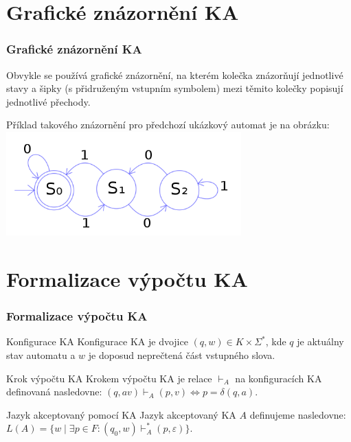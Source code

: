 \documentclass{beamer}
\begin{document}
	\section{Grafické znázornění KA}
	\begin{frame}
		\frametitle{Grafické znázornění KA}
		Obvykle se používá grafické znázornění, na kterém kolečka znázorňují jednotlivé stavy a šipky (s přidruženým vstupním symbolem) mezi těmito kolečky popisují jednotlivé přechody.
		
		Příklad takového znázornění pro předchozí ukázkový automat je na obrázku:\\
		\includegraphics[height=4cm]{example.png}
	\end{frame}

	\section{Formalizace výpočtu KA}
	\begin{frame}
		\frametitle{Formalizace výpočtu KA}
		\begin{block}{Konfigurace KA}
			Konfigurace KA je dvojice $(q , w) \in K \times \Sigma^*$, kde $q$ je aktuálny stav automatu a $w$ je doposud neprečtená část vstupného slova.
		\end{block}
		\begin{block}{Krok výpočtu KA}
			Krokem výpočtu KA je relace $\vdash_A$ na konfiguracích KA definovaná nasledovne: $(q, av) \vdash_A (p, v) \Longleftrightarrow p = \delta (q, a)$.
		\end{block}
		\begin{block}{Jazyk akceptovaný pomocí KA}
			Jazyk akceptovaný KA $A$ definujeme nasledovne:
			$L(A) = \{w \mid \exists p\in F:(q_0, w) \vdash_A^*(p, \varepsilon)\}.$
		\end{block}
	\end{frame}
\end{document}
